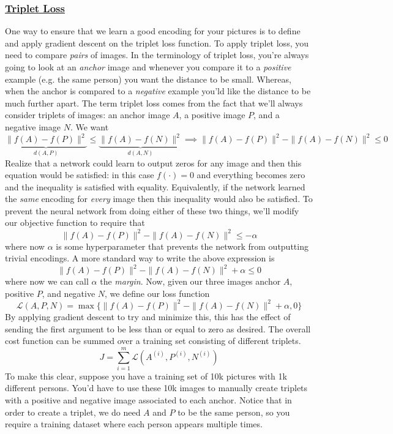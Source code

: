 \documentclass[12pt]{article}
\begin{document}
\subsubsection{\href{https://arxiv.org/abs/1503.03832}{Triplet Loss}} One way to ensure that we learn a good encoding for your pictures is to define and apply gradient descent on the triplet loss function. To apply triplet loss, you need to compare \emph{pairs} of images. In the terminology of triplet loss, you're always going to look at an \emph{anchor} image and whenever you compare it to a \emph{positive} example (e.g. the same person) you want the distance to be small. Whereas, when the anchor is compared to a \emph{negative} example you'ld like the distance to be much further apart. The term triplet loss comes from the fact that we'll always consider triplets of images: an anchor image $A$, a positive image $P$, and a negative image $N$. We want
\[
\underbrace{\|f(A) - f(P)\|^2}_{d(A,P)} \leq \underbrace{\|f(A) - f(N)\|^2}_{d(A,N)} \implies \|f(A) - f(P)\|^2 - \|f(A) - f(N)\|^2 \leq 0
\]
Realize that a network could learn to output zeros for any image and then this equation would be satisfied: in this case $f(\cdot) = 0$ and everything becomes zero and the inequality is satisfied with equality. Equivalently, if the network learned the \emph{same} encoding for \emph{every} image then this inequality would also be satisfied. To prevent the neural network from doing either of these two things, we'll modify our objective function to require that
\[
\|f(A) - f(P)\|^2 - \|f(A) - f(N)\|^2 \leq -\alpha
\]
where now $\alpha$ is some hyperparameter that prevents the network from outputting trivial encodings. A more standard way to write the above expression is 
\[
\|f(A) - f(P)\|^2 - \|f(A) - f(N)\|^2 + \alpha \leq 0
\]
where now we can call $\alpha$ the \emph{margin}. Now, given our three images anchor $A$, positive $P$, and negative $N$, we define our loss function
\[
\mathcal L (A, P, N) = \max{\{\|f(A) - f(P)\|^2 - \|f(A) - f(N)\|^2 + \alpha, 0\}}
\]
By applying gradient descent to try and minimize this, this has the effect of sending the first argument to be less than or equal to zero as desired. The overall cost function can be summed over a training set consisting of different triplets.
\[
J = \sum_{i=1}^m \mathcal L(A^{(i)}, P^{(i)}, N^{(i)})
\]
To make this clear, suppose you have a training set of 10k pictures with 1k different persons. You'd have to use these 10k images to manually create triplets with a positive and negative image associated to each anchor. Notice that in order to create a triplet, we do need $A$ and $P$ to be the same person, so you require a training dataset where each person appears multiple times.
\end{document}

